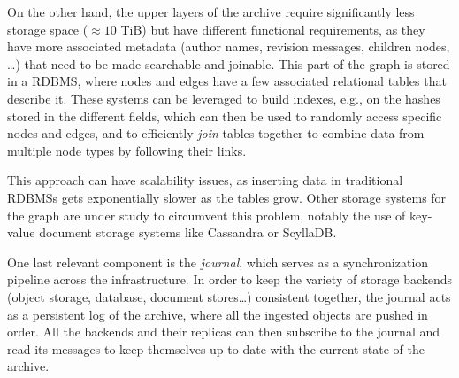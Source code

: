 On the other hand, the upper layers of the archive require significantly less
storage space ($\approx 10$ TiB) but have different functional requirements, as
they have more associated metadata (author names, revision messages, children
nodes, …) that need to be made searchable and joinable. This part of the graph
is stored in a \gls{RDBMS}, where nodes and edges have a few associated
relational tables that describe it. These systems can be leveraged to build
indexes, e.g., on the hashes stored in the different fields, which can then be
used to randomly access specific nodes and edges, and to efficiently
\emph{join} tables together to combine data from multiple node types by
following their links.

This approach can have scalability issues, as inserting data in traditional
\glspl{RDBMS} gets exponentially slower as the tables grow.  Other storage
systems for the graph are under study to circumvent this problem, notably the
use of key-value document storage systems like Cassandra or ScyllaDB\@.

One last relevant component is the \emph{journal}, which serves as a
synchronization pipeline across the infrastructure. In order to keep the
variety of storage backends (object storage, database, document stores…)
consistent together, the journal acts as a persistent log of the archive, where
all the ingested objects are pushed in order. All the backends and their
replicas can then subscribe to the journal and read its messages to keep
themselves up-to-date with the current state of the archive.
